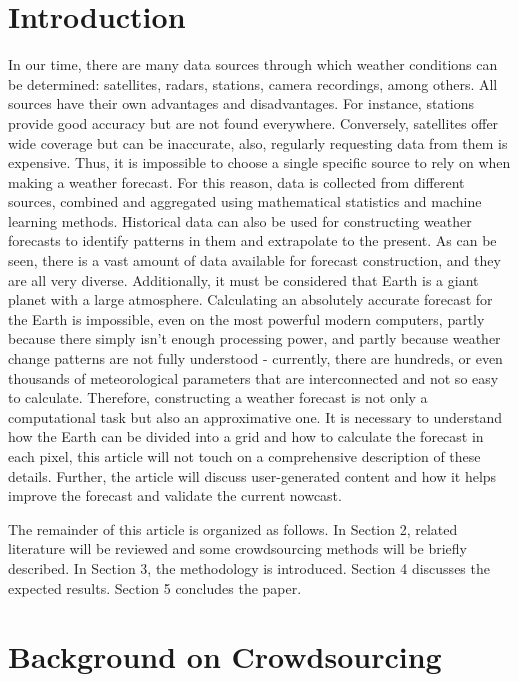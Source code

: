 \documentclass[conference]{IEEEtran}
\begin{document}
\section{Introduction}
In our time, there are many data sources through which weather conditions can be determined: satellites, radars, stations, camera recordings, among others. All sources have their own advantages and disadvantages. For instance, stations provide good accuracy but are not found everywhere. Conversely, satellites offer wide coverage but can be inaccurate, also, regularly requesting data from them is expensive. Thus, it is impossible to choose a single specific source to rely on when making a weather forecast. For this reason, data is collected from different sources, combined and aggregated using mathematical statistics and machine learning methods. Historical data can also be used for constructing weather forecasts to identify patterns in them and extrapolate to the present. As can be seen, there is a vast amount of data available for forecast construction, and they are all very diverse. Additionally, it must be considered that Earth is a giant planet with a large atmosphere. Calculating an absolutely accurate forecast for the Earth is impossible, even on the most powerful modern computers, partly because there simply isn't enough processing power, and partly because weather change patterns are not fully understood - currently, there are hundreds, or even thousands of meteorological parameters that are interconnected and not so easy to calculate. Therefore, constructing a weather forecast is not only a computational task but also an approximative one.
It is necessary to understand how the Earth can be divided into a grid and how to calculate the forecast in each pixel, this article will not touch on a comprehensive description of these details. Further, the article will discuss user-generated content and how it helps improve the forecast and validate the current nowcast.

The remainder of this article is organized as follows. In Section 2, related literature will be reviewed and some crowdsourcing methods will be briefly described. In Section 3, the methodology is introduced. Section 4 discusses the expected results. Section 5 concludes the paper.

\section{Background on Crowdsourcing}
\end{document}
